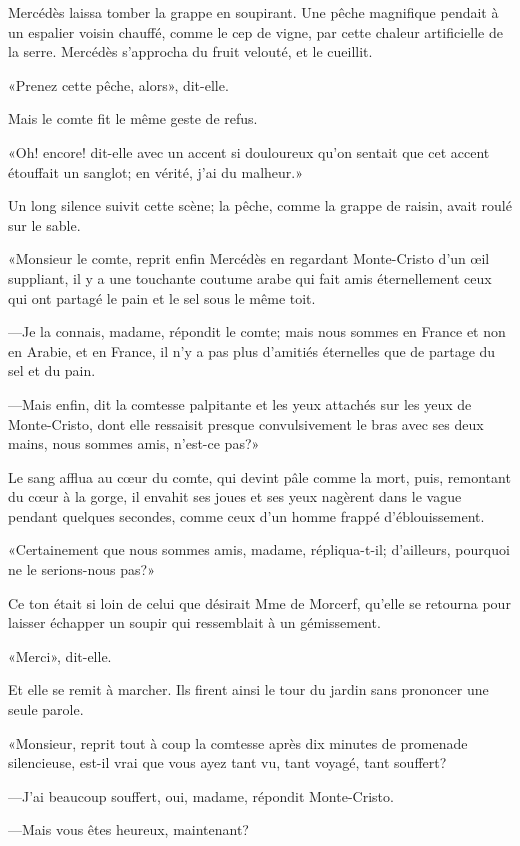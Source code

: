 Mercédès laissa tomber la grappe en soupirant. Une pêche magnifique pendait à un espalier voisin chauffé, comme le cep de vigne, par cette chaleur artificielle de la serre. Mercédès s'approcha du fruit velouté, et le cueillit. 

«Prenez cette pêche, alors», dit-elle. 

Mais le comte fit le même geste de refus. 

«Oh! encore! dit-elle avec un accent si douloureux qu'on sentait que cet accent étouffait un sanglot; en vérité, j'ai du malheur.» 

Un long silence suivit cette scène; la pêche, comme la grappe de raisin, avait roulé sur le sable. 

«Monsieur le comte, reprit enfin Mercédès en regardant Monte-Cristo d'un œil suppliant, il y a une touchante coutume arabe qui fait amis éternellement ceux qui ont partagé le pain et le sel sous le même toit. 

—Je la connais, madame, répondit le comte; mais nous sommes en France et non en Arabie, et en France, il n'y a pas plus d'amitiés éternelles que de partage du sel et du pain. 

—Mais enfin, dit la comtesse palpitante et les yeux attachés sur les yeux de Monte-Cristo, dont elle ressaisit presque convulsivement le bras avec ses deux mains, nous sommes amis, n'est-ce pas?» 

Le sang afflua au cœur du comte, qui devint pâle comme la mort, puis, remontant du cœur à la gorge, il envahit ses joues et ses yeux nagèrent dans le vague pendant quelques secondes, comme ceux d'un homme frappé d'éblouissement. 

«Certainement que nous sommes amis, madame, répliqua-t-il; d'ailleurs, pourquoi ne le serions-nous pas?» 

Ce ton était si loin de celui que désirait Mme de Morcerf, qu'elle se retourna pour laisser échapper un soupir qui ressemblait à un gémissement. 

«Merci», dit-elle. 

Et elle se remit à marcher. Ils firent ainsi le tour du jardin sans prononcer une seule parole. 

«Monsieur, reprit tout à coup la comtesse après dix minutes de promenade silencieuse, est-il vrai que vous ayez tant vu, tant voyagé, tant souffert? 

—J'ai beaucoup souffert, oui, madame, répondit Monte-Cristo. 

—Mais vous êtes heureux, maintenant? 

